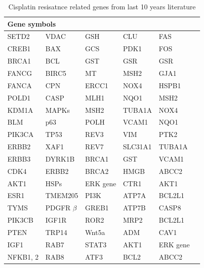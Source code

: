  \begin{table}[htbp]
   \centering
   \caption{Cisplatin resisatnce related genes from last 10 years literature}
     \begin{tabular}{|l|l|l|l|l|r}
     \hline
     \multicolumn{5}{|l|}{Gene symbols} \\
     \hline
     SETD2 & VDAC & GSH & CLU  & FAS \\
     CREB1 & BAX & GCS & PDK1 & FOS \\
     BRCA1 & BCL & GST & GSR  & GSR \\
     FANCG & BIRC5  & MT & MSH2  & GJA1 \\
     FANCA & CPN & ERCC1 & NOX4  & HSPB1 \\
     POLD1 & CASP & MLH1 & NQO1 & MSH2 \\
     KDM1A & MAPKs & MSH2 & TUBA1A  & NOX4 \\
     BLM & p63 & POLH & VCAM1  & NQO1 \\
     PIK3CA & TP53 & REV3 & VIM  & PTK2 \\
     ERBB2 & XAF1 & REV7 & SLC31A1 & TUBA1A \\
     ERBB3 & DYRK1B & BRCA1 & GST & VCAM1 \\
     CDK4 & ERBB2  & BRCA2 & HMGB & ABCC2  \\
     AKT1 & HSPs & ERK gene & CTR1 & AKT1  \\
     ESR1 & TMEM205 & PI3K & ATP7A & BCL2L1  \\
     TYMS & PDGFR $\beta$ & GREB1 & ATP7B & CASP8  \\
     PIK3CB & IGF1R & ROR2 & MRP2 & BCL2L1 \\
     PTEN & TRP14 & Wnt5a & ADM & CAV1 \\
     IGF1 & RAB7 & STAT3 & AKT1 & ERK gene \\
     NFKB1, 2 & RAB8 & ATF3 & BCL2 & ABCC2 \\
     \hline
     \end{tabular}%
   \label{tab:Cisplatinrelatedgenes}%
 \end{table}%




